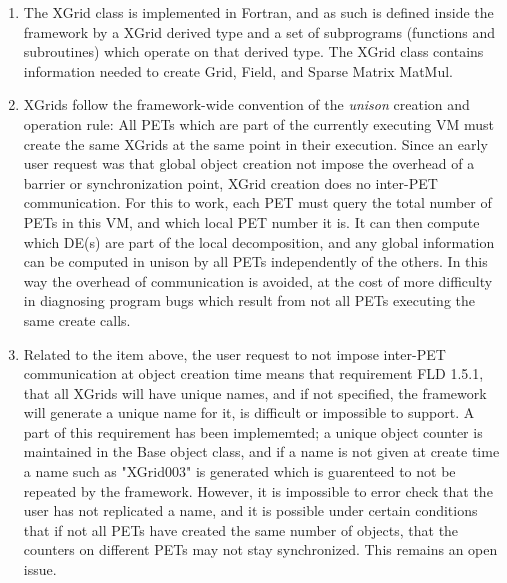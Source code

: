 

\begin{enumerate}

\item The XGrid class is implemented in Fortran, and as such is
defined inside the framework by a XGrid derived type and a set of 
subprograms (functions and subroutines) which operate on that derived type.  
The XGrid class contains information needed to create Grid, Field, and
Sparse Matrix MatMul.

\item XGrids follow the framework-wide convention of the
{\it unison} creation and operation rule: All PETs which are
part of the currently executing VM must create the
same XGrids at the same point in their execution.  Since an early
user request was that global object creation not impose the overhead of
a barrier or synchronization point, XGrid creation does no inter-PET
communication.  For this to work, each PET must query the total number
of PETs in this VM, and which local PET number it is.  It can then
compute which DE(s) are part of the local decomposition, and any
global information can be computed in unison by all PETs independently
of the others.  In this way the overhead of communication is avoided,
at the cost of more difficulty in diagnosing program bugs which result
from not all PETs executing the same create calls.

\item Related to the item above, the user request to not impose
inter-PET communication at object creation time means that requirement
FLD 1.5.1, that all XGrids will have unique names, and if not specified, 
the framework will generate a unique name for it, is difficult or
impossible to support.  A part of this requirement has been implememted;
a unique object counter is maintained in the Base object class, and if
a name is not given at create time a name such as "XGrid003" is generated
which is guarenteed to not be repeated by the framework.   However, it
is impossible to error check that the user has not replicated a name,
and it is possible under certain conditions that if not all PETs have
created the same number of objects, that the counters on different PETs
may not stay synchronized.   This remains an open issue.

\end{enumerate}
